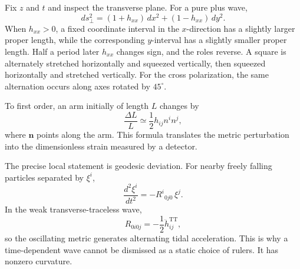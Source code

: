 Fix \(z\) and \(t\) and inspect the transverse plane. For a pure plus wave,
\begin{equation}
 ds_\perp^2
 =(1+h_{xx})\,dx^2+(1-h_{xx})\,dy^2.
 \label{eq:transverse-distance}
\end{equation}
When \(h_{xx}>0\), a fixed coordinate interval in the \(x\)-direction has a
slightly larger proper length, while the corresponding \(y\)-interval has a
slightly smaller proper length. Half a period later \(h_{xx}\) changes sign,
and the roles reverse. A square is alternately stretched horizontally and
squeezed vertically, then squeezed horizontally and stretched vertically.
For the cross polarization, the same alternation occurs along axes rotated
by \(45^\circ\).

To first order, an arm initially of length \(L\) changes by
\begin{equation}
 \frac{\Delta L}{L}\simeq\frac12 h_{ij}n^i n^j,
 \label{eq:fractional-strain}
\end{equation}
where \(\mathbf n\) points along the arm. This formula translates the metric
perturbation into the dimensionless strain measured by a detector.

\begin{classroomqa}
\end{classroomqa}

The precise local statement is geodesic deviation. For nearby freely falling
particles separated by \(\xi^i\),
\begin{equation}
 \frac{d^2\xi^i}{dt^2}
 =-R^i{}_{0j0}\,\xi^j.
 \label{eq:geodesic-deviation}
\end{equation}
In the weak transverse-traceless wave,
\begin{equation}
 R_{0i0j}=-\frac12\ddot h^{\mathrm{TT}}_{ij},
 \label{eq:tidal-curvature}
\end{equation}
so the oscillating metric generates alternating tidal acceleration. This is
why a time-dependent wave cannot be dismissed as a static choice of rulers.
It has nonzero curvature.

